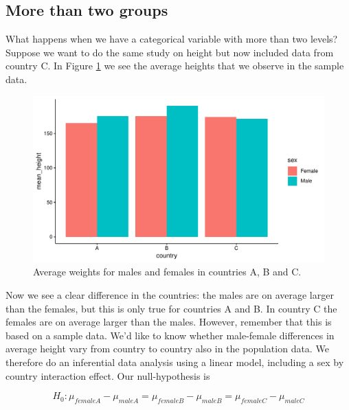 \documentclass[]{book}\usepackage[]{graphicx}\usepackage[]{color}
\makeatletter
\def\maxwidth{ %
  \ifdim\Gin@nat@width>\linewidth
    \linewidth
  \else
    \Gin@nat@width
  \fi
}
\newenvironment{knitrout}{}{} %
\makeatother
\begin{document}
\subsection{More than two groups}

What happens when we have a categorical variable with more than two levels? Suppose we want to do the same study on height but now included data from country C. In Figure \ref{fig:country_sex3} we see the average heights that we observe in the sample data.

\begin{knitrout}
\color{fgcolor}\begin{figure}

{\centering \includegraphics[width=\maxwidth]{figure/country_sex3-1} 

}

\caption[Average weights for males and females in countries A, B and C]{Average weights for males and females in countries A, B and C.}\label{fig:country_sex3}
\end{figure}


\end{knitrout}

Now we see a clear difference in the countries: the males are on average larger than the females, but this is only true for countries A and B. In country C the females are on average larger than the males. However, remember that this is based on a sample data. We'd like to know whether male-female differences in average height vary from country to country also in the population data. We therefore do an inferential data analysis using a linear model, including a sex by country interaction effect. Our null-hypothesis is 

\begin{equation}
H_0: \mu_{femaleA}-\mu_{maleA}=\mu_{femaleB}-\mu_{maleB}=\mu_{femaleC}-\mu_{maleC}
\end{equation}
\end{document}

